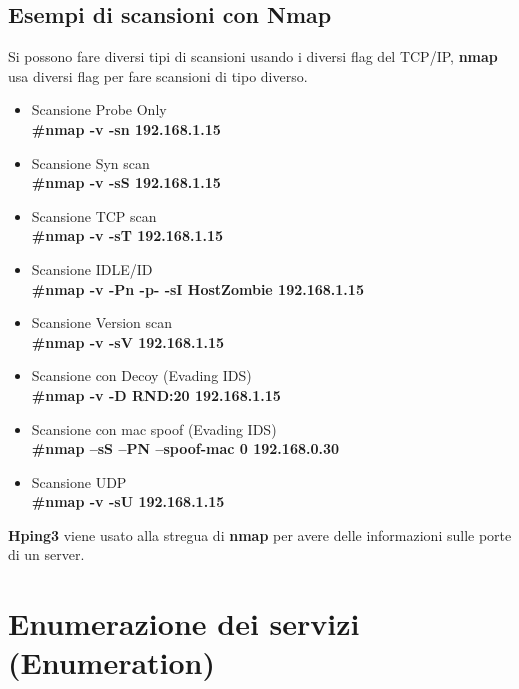 \documentclass[a4paper,12pt]{article}
\begin{document}
\subsection{Esempi di scansioni con Nmap}
Si possono fare diversi tipi di scansioni usando i diversi flag del TCP/IP, \textbf{nmap}\cite{nmap}
usa diversi flag per fare scansioni di tipo diverso.
\begin{itemize}
    \item Scansione Probe Only \\
      \textbf{ \#nmap  -v -sn 192.168.1.15}
    \item Scansione Syn scan \\
        \textbf{ \#nmap  -v -sS 192.168.1.15}
    \item Scansione TCP scan \\
        \textbf{ \#nmap  -v -sT 192.168.1.15}
    \item Scansione IDLE/ID \\
        \textbf{ \#nmap  -v -Pn -p- -sI HostZombie 192.168.1.15} 
    \item Scansione Version scan \\
        \textbf{ \#nmap  -v -sV 192.168.1.15} 
     \item Scansione con Decoy (Evading IDS) \\
        \textbf{ \#nmap -v -D RND:20 192.168.1.15}     
     \item Scansione con mac spoof (Evading IDS)\\
        \textbf{ \#nmap –sS –PN –spoof-mac 0 192.168.0.30}
    \item Scansione UDP \\
        \textbf{ \#nmap  -v -sU 192.168.1.15}
\end{itemize}

\textbf{ Hping3}\cite{hping3} viene usato alla stregua di \textbf{nmap}\cite{nmap} per avere delle informazioni sulle porte di un server.

\section{ Enumerazione  dei servizi (Enumeration)}
\end{document}
